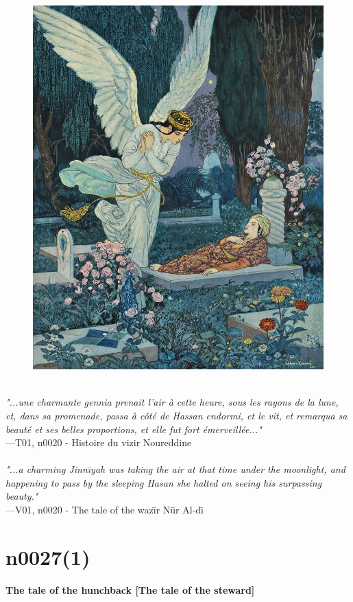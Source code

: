 \documentclass[../Carre_nights.tex]{subfiles}
\begin{document}
\begin{figure}[ht]
\centering
\includegraphics[height=\figsize]{illustrations/volume_1/T01, n0020 - Histoire du vizir Noureddine.jpg}
\end{figure}

\textit{\\
"...une charmante gennia prenait l’air à cette heure, sous les rayons de la lune, et, dans sa promenade, passa à côté de Hassan endormi, et le vit, et remarqua sa beauté et ses belles proportions, et elle fut fort émerveillée..."} \\
—T01, n0020 - Histoire du vizir Noureddine \\~\\
\textit{"...a charming Jinn\={\i}yah was taking the air at that time under the moonlight, and happening to pass by the sleeping Hasan she halted on seeing his surpassing beauty."} \\
—V01, n0020 - The tale of the waz\={\i}r N\=ur Al-d\={\i}

\newpage

\section{n0027(1)}
\textbf{\Large{The tale of the hunchback [The tale of the steward]}} \\
\end{document}
